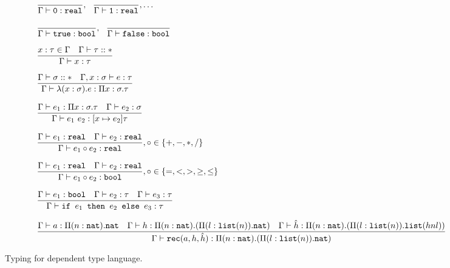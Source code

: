 \begin{figure}
\[
\begin{array}{lr}
 \\ \\
\dfrac{}{\Gamma \vdash \texttt{0}: \texttt{real}}, \ \ \dfrac{}{\Gamma \vdash \texttt{1}: \texttt{real}}, \ldots \\ \\
\dfrac{}{\Gamma \vdash \texttt{true} : \texttt{bool}}, \ \ \dfrac{}{\Gamma \vdash \texttt{false} : \texttt{bool}} \\  \\
\dfrac{x : \tau \in \Gamma \ \ \ \Gamma \vdash \tau :: *}{\Gamma \vdash x : \tau } \\ \\ 
\dfrac{\Gamma \vdash \sigma :: * \ \ \ \Gamma, x : \sigma \vdash e : \tau}
	{\Gamma \vdash \lambda (x : \sigma).e : \Pi x:\sigma.\tau } \\ \\
\dfrac{\Gamma \vdash e_1: \Pi x:\sigma.\tau \ \ \ \Gamma \vdash e_2 : \sigma}
	{\Gamma \vdash e_1 \ e_2 : [x \mapsto e_2]\tau} \\ \\
\dfrac{\Gamma \vdash e_1 : \texttt{real} \ \ \ \Gamma \vdash e_2 : \texttt{real}}
	{\Gamma \vdash e_1 \circ e_2 : \texttt{real}}
, \circ \in \{+,-,*,/\} \\ \\ 
\dfrac{\Gamma \vdash e_1 : \texttt{real} \ \ \ \Gamma \vdash e_2 : \texttt{real}}
	{\Gamma \vdash e_1 \circ e_2 : \texttt{bool}}
	, \circ \in \{=, <, >, \geq, \leq\} \\ \\ 
\dfrac{\Gamma \vdash e_1 : \texttt{bool} \ \ \ \Gamma \vdash e_2 : \tau \ \ \ \Gamma \vdash e_3 : \tau}
	{\Gamma \vdash \ifelse{e_1}{e_2}{e_3} : \tau} \\ \\ 
\dfrac{\Gamma \vdash a: \Pi (n:\texttt{nat}).\texttt{nat} \ \ \ \Gamma \vdash h: \Pi(n:\texttt{nat}).(\Pi (l:\lst(n)).\texttt{nat}) \ \ \ \Gamma \vdash \hat{h}: \Pi(n: \texttt{nat}).(\Pi(l : \lst(n)).\lst(h n l))}
	{\Gamma \vdash \texttt{rec}(a, h, \hat{h}) : \Pi(n:\texttt{nat}).(\Pi (l:\lst(n)).\texttt{nat})}
\end{array}
\]
\caption{Typing for dependent type language.}
\end{figure}

